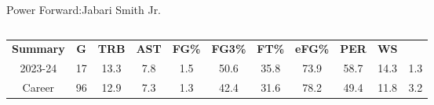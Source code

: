 \begin{frame}{Power Forward:Jabari Smith Jr.}
    \pause
    \begin{columns}
        \begin{column}{0.4\textwidth}
            \begin{table}[h]
                \small
                \centering
                \begin{tabular}{ c|cccc|cccc|cc }
                    \textbf{Summary} & \textbf{G} &\textbf{TRB} &\textbf{AST} & \textbf{FG\%} & \textbf{FG3\%} &\textbf{FT\%} &\textbf{eFG\%} & \textbf{PER} & \textbf{WS} \\
                    2023-24 & 17 & 13.3 & 7.8 & 1.5 & 50.6 & 35.8 & 73.9 & 58.7 & 14.3 & 1.3 \\
                    \pause
                    Career & 96 & 12.9 & 7.3 & 1.3 & 42.4 & 31.6 & 78.2 & 49.4 & 11.8 & 3.2 \\
                \end{tabular}
                \label{fig:player-statistics}
            \end{table}
        \end{column}
        \begin{column}{0.3\textwidth}
            \begin{figure}[t]
                \vspace{-14em}
                \label{fig:Jalen-Green}
            \end{figure}
        \end{column}
    \end{columns}
\end{frame}

